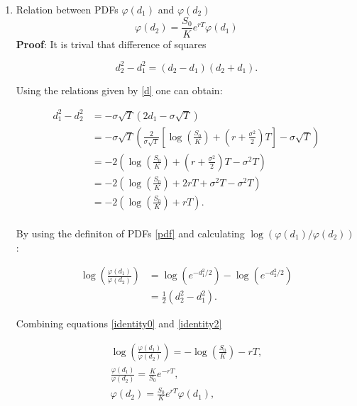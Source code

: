 \documentclass[12pt]{article}
\begin{document}
\begin{enumerate}[leftmargin=\labelsep]
\begin{enumerate}
    \item Relation between PDFs $\varphi(d_1)$ and $\varphi(d_2)$
    \begin{equation}\label{identity1}
        \varphi(d_2) =\frac{S_0}{K} e^{rT} \varphi(d_1)
    \end{equation}
    \textbf{Proof}: It is trival that difference of squares
    
    \begin{equation}
        d_2^2 - d_1^2 = (d_2-d_1)(d_2 + d_1).
    \end{equation}
    
    Using the relations given by \eqref{d} one can obtain:

    \begin{equation}
    \begin{split}\label{identity0}
        d_1^2 - d_2^2 &=  - \sigma \sqrt{T} \left( 2 d_1 - \sigma \sqrt{T} \right) \\
        &=  - \sigma \sqrt{T} \left( \frac{2}{\sigma\sqrt{T}}\left[\log\left(\frac{S_0}{K}\right) + \left(r + \frac{\sigma^2}{2}\right)T\right]  - \sigma \sqrt{T} \right)\\
        &=  -2 \left(\log\left(\frac{S_0}{K}\right) + \left(r + \frac{\sigma^2}{2}\right)T  - \sigma^2 T \right) \\
        &=  -2 \left( \log\left(\frac{S_0}{K}\right) + 2rT + \sigma^2 T  - \sigma^2 T \right)\\
        &=  -2 \left( \log\left(\frac{S_0}{K}\right) + rT \right).\\
    \end{split}
    \end{equation}

    By using the definiton of PDFs \eqref{pdf} and calculating $\log(\varphi(d_1)/ \varphi(d_2))$:

    \begin{equation}
    \begin{split}\label{identity2}
        \log \left( \frac{\varphi(d_1)}{\varphi(d_2)} \right)
        & = \log \left( e^{-d_1^2/2} \right) - \log \left( e^{-d_2^2/2} \right) \\
        & = \frac{1}{2} \left( d_2^2 - d_1^2 \right).
    \end{split}
    \end{equation}

    Combining equations \eqref{identity0} and \eqref{identity2}

    \begin{equation}
    \begin{split}
    \log \left( \frac{\varphi(d_1)}{\varphi(d_2)} \right) = -\log\left(\frac{S_0}{K}\right) - rT, \\
    \frac{\varphi(d_1)}{\varphi(d_2)} = \frac{K}{S_0} e^{-rT}, \\
    \varphi(d_2) =\frac{S_0}{K} e^{rT} \varphi(d_1) ,
    \end{split}
    \end{equation}


\end{enumerate}
\end{enumerate}
\end{document}
